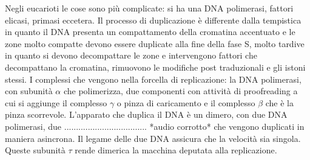 Negli eucarioti le cose sono pi\`u complicate: si ha una DNA polimerasi, fattori elicasi, primasi eccetera. Il processo di duplicazione \`e differente dalla tempistica in quanto il DNA
presenta un compattamento della cromatina accentuato e le zone molto compatte devono essere duplicate alla fine della fase S, molto tardive in quanto si devono decompattare le zone e 
intervengono fattori che decompattano la cromatina, rimuovono le modifiche post traduzionali e gli istoni stessi. I complessi che vengono nella forcella di replicazione: la DNA 
polimerasi, con subunit\`a $\alpha$ che polimerizza, due componenti con attivit\`a di proofreading a cui si aggiunge il complesso $\gamma$ o pinza di caricamento e il complesso $\beta$
che \`e la pinza scorrevole. L'apparato che duplica il DNA \`e un dimero, con due DNA polimerasi, due ................................... *audio corrotto* che vengono duplicati in maniera
asincrona. Il legame delle due DNA assicura che la velocit\`a sia singola. Queste subunit\`a $\tau$ rende dimerica la macchina deputata alla replicazione. 

